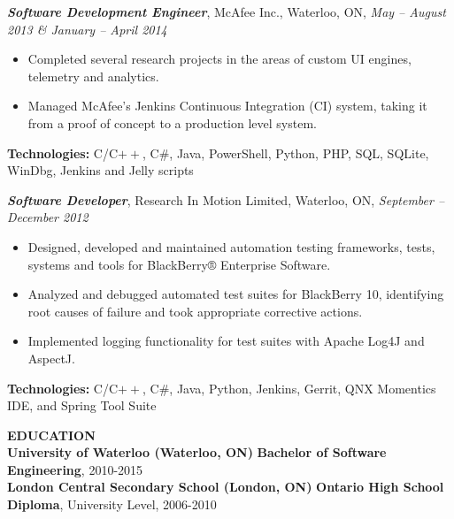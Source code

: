 \documentclass[10pt,letterpaper]{article}
\newcommand{\job}[4]
{
    \emph{\textbf{#1}}, #2, #3, \emph{#4}
}
\newcommand{\education}[4]
{
    \textbf{#1 (#2)} \textbf{#3}, #4
}
\begin{document}
\vspace{0.8em}
\job{Software Development Engineer}{McAfee Inc.}{Waterloo, ON}{ May -- August 2013 \& January -- April 2014 }\\
\begin{adjustwidth}{0.1in}{0.5in}
    \begin{itemize}
	\item Completed several research projects in the areas of custom UI engines, telemetry and analytics.
	\item Managed McAfee's Jenkins Continuous Integration (CI) system, taking it from a proof of concept to a production level system.
    \end{itemize}
    \vspace{0.5em}
    \textbf{Technologies:} C/C$++$, C\#, Java, PowerShell, Python, PHP, SQL, SQLite, WinDbg, Jenkins and Jelly scripts
\end{adjustwidth}
\vspace{0.8em}
\job{Software Developer}{Research In Motion Limited}{Waterloo, ON}{September -- December 2012}\\
\begin{adjustwidth}{0.1in}{0.5in}
    \begin{itemize}
        \item Designed, developed and maintained automation testing frameworks, tests, systems and tools for BlackBerry® Enterprise Software.
        \item Analyzed and debugged automated test suites for BlackBerry 10, identifying root causes of failure and took appropriate corrective actions.
        \item Implemented logging functionality for test suites with Apache Log4J and AspectJ.
    \end{itemize}
    \vspace{0.5em}    
    \textbf{Technologies:} C/C$++$, C\#, Java, Python, Jenkins, Gerrit, QNX Momentics IDE, and Spring Tool Suite
\end{adjustwidth}
\vspace{1em}
\textbf{EDUCATION} \hrulefill \\[0.5em]
\education{University of Waterloo}{Waterloo, ON}{Bachelor of Software Engineering}{2010-2015}\\[1em]
\education{London Central Secondary School}{London, ON}{Ontario High School Diploma}{University Level, 2006-2010}\\[1em]
\end{document}
